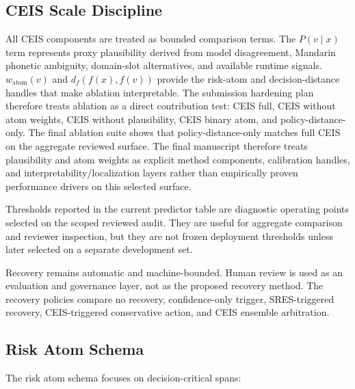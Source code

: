 \documentclass[
]{article}
\begin{document}
\hypertarget{ceis-scale-discipline}{%
\subsection{CEIS Scale Discipline}\label{ceis-scale-discipline}}

All CEIS components are treated as bounded comparison terms. The
\(P(v \mid x)\) term represents proxy
plausibility derived from model disagreement, Mandarin phonetic
ambiguity, domain-slot alternatives, and available runtime signals.
\(w_{\mathrm{atom}}(v)\) and
\(d_f(f(x), f(v))\) provide the risk-atom and
decision-distance handles that make ablation interpretable. The
submission hardening plan therefore treats ablation as a direct
contribution test: CEIS full, CEIS without atom weights, CEIS without
plausibility, CEIS binary atom, and policy-distance-only. The final
ablation suite shows that policy-distance-only matches full CEIS on the
aggregate reviewed surface. The final manuscript therefore treats
plausibility and atom weights as explicit method components,
calibration handles, and interpretability/localization layers rather
than empirically proven performance drivers on this selected surface.

Thresholds reported in the current predictor table are diagnostic
operating points selected on the scoped reviewed audit. They are useful
for aggregate comparison and reviewer inspection, but they are not
frozen deployment thresholds unless later selected on a separate
development set.

Recovery remains automatic and machine-bounded. Human review is used as
an evaluation and governance layer, not as the proposed recovery method.
The recovery policies compare no recovery, confidence-only trigger,
SRES-triggered recovery, CEIS-triggered conservative action, and CEIS
ensemble arbitration.

\hypertarget{risk-atom-schema}{%
\subsection{Risk Atom Schema}\label{risk-atom-schema}}

The risk atom schema focuses on decision-critical spans:
\end{document}
